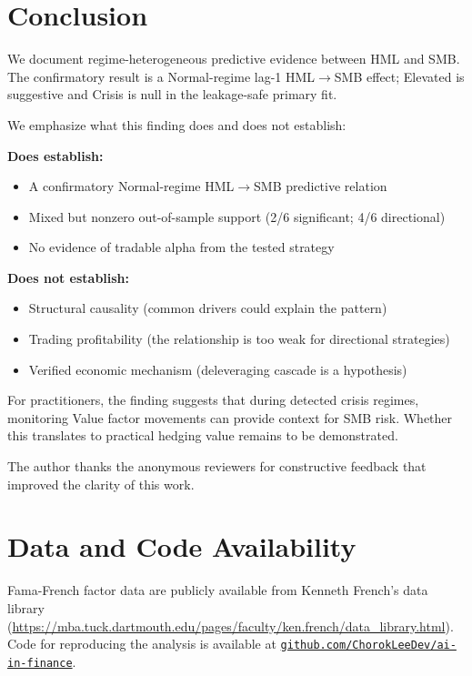 \documentclass[sigconf]{acmart}
\begin{document}
\section{Conclusion}

We document regime-heterogeneous predictive evidence between HML and SMB.
The confirmatory result is a Normal-regime lag-1 HML$\to$SMB effect; Elevated
is suggestive and Crisis is null in the leakage-safe primary fit.

We emphasize what this finding does and does not establish:

\textbf{Does establish:}
\begin{itemize}
    \item A confirmatory Normal-regime HML$\to$SMB predictive relation
    \item Mixed but nonzero out-of-sample support (2/6 significant; 4/6 directional)
    \item No evidence of tradable alpha from the tested strategy
\end{itemize}

\textbf{Does not establish:}
\begin{itemize}
    \item Structural causality (common drivers could explain the pattern)
    \item Trading profitability (the relationship is too weak for directional strategies)
    \item Verified economic mechanism (deleveraging cascade is a hypothesis)
\end{itemize}

For practitioners, the finding suggests that during detected crisis regimes,
monitoring Value factor movements can provide context for SMB risk. Whether this
translates to practical hedging value remains to be demonstrated.

\begin{acks}
The author thanks the anonymous reviewers for constructive feedback that improved
the clarity of this work.
\end{acks}

\section*{Data and Code Availability}
Fama-French factor data are publicly available from Kenneth French's data library
(\url{https://mba.tuck.dartmouth.edu/pages/faculty/ken.french/data_library.html}).
Code for reproducing the analysis is available at
\href{https://github.com/ChorokLeeDev/ai-in-finance}{\nolinkurl{github.com/ChorokLeeDev/ai-in-finance}}.


\end{document}
